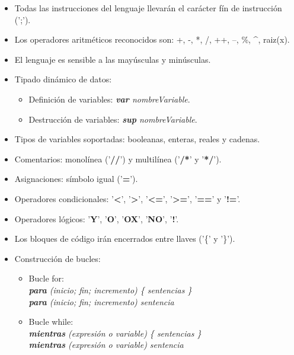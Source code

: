 \documentclass[a4paper,12pt]{article}
\begin{document}
  \begin{itemize}
    \item Todas las instrucciones del lenguaje llevarán el carácter fín de instrucción (';').
    \item Los operadores aritméticos reconocidos son: +, -, *, /, ++, --, \%, \textasciicircum, raiz(x).
    \item El lenguaje es sensible a las mayúsculas y minúsculas.
    \item Tipado dinámico de datos:
          \begin{itemize}
            \item Definición de variables: \textit{\textbf{var} nombreVariable}.
            \item Destrucción de variables: \textit{\textbf{sup} nombreVariable}.
          \end{itemize}
    \item Tipos de variables soportadas: booleanas, enteras, reales y cadenas.
    \item Comentarios: monolínea ('\textbf{//}') y multilínea ('\textbf{/*}' y '\textbf{*/}').
    \item Asignaciones: símbolo igual ('\textbf{=}').
    \item Operadores condicionales: '\textbf{<}', '\textbf{>}', '\textbf{<=}', '\textbf{>=}', '\textbf{==}' y '\textbf{!=}'.
    \item Operadores lógicos: '\textbf{Y}', '\textbf{O}', '\textbf{OX}', '\textbf{NO}', '\textbf{!}'.
    \item Los bloques de código irán encerrados entre llaves ('\{' y '\}').
    \item Construcción de bucles:
          \begin{itemize}
            \item Bucle for: \\
                  \hspace{1.5cm}\textit{\textbf{para} (inicio; fin; incremento) \{ sentencias \}} \\
                  \hspace{1.5cm}\textit{\textbf{para} (inicio; fin; incremento) sentencia}
            \item Bucle while: \\
                  \hspace{1.5cm}\textit{\textbf{mientras} (expresión o variable) \{ sentencias \}}\\
                  \hspace{1.5cm}\textit{\textbf{mientras} (expresión o variable) sentencia}

\end{itemize}
\end{itemize}
\end{document}
